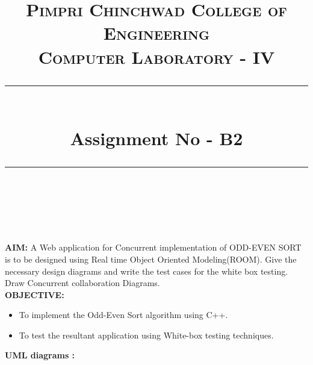 \documentclass[a4paper,12pt]{article}
\title{
	\normalfont \normalsize 
	\textsc{Pimpri Chinchwad College of Engineering \\ 
		Computer Laboratory - IV} \\
	[10pt]   
	\rule{\linewidth}{0.5pt} \\[6pt] 
	\huge Assignment No - B2 \\
	\rule{\linewidth}{2pt}  \\[10pt]
}
\author{}
\date{\normalsize}
\begin{document}
	\maketitle

\textbf{AIM: } A Web application for Concurrent implementation of ODD-EVEN SORT is to be designed using Real time Object Oriented Modeling(ROOM). Give the necessary design diagrams and write the test cases for the white box testing. Draw Concurrent collaboration Diagrams.
\\

\noindent \textbf{OBJECTIVE:}
\begin{itemize}
\item To implement the Odd-Even Sort algorithm using C++.
\item To test the resultant application using White-box testing techniques.
\end{itemize}
\noindent \textbf{UML diagrams :}\\
\end{document}
